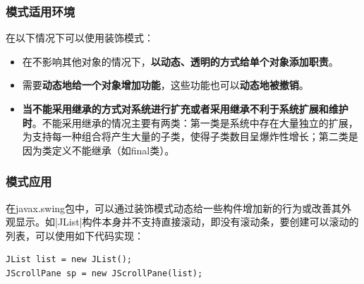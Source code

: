 \subsubsection{模式适用环境}
在以下情况下可以使用装饰模式：
\begin{itemize}
    \item 在不影响其他对象的情况下，\textbf{以动态、透明的方式给单个对象添加职责}。
    \item 需要\textbf{动态地给一个对象增加功能}，这些功能也可以\textbf{动态地被撤销}。
    \item \textbf{当不能采用继承的方式对系统进行扩充或者采用继承不利于系统扩展和维护时}。不能采用继承的情况主要有两类：第一类是系统中存在大量独立的扩展，为支持每一种组合将产生大量的子类，使得子类数目呈爆炸性增长；第二类是因为类定义不能继承（如final类）。
\end{itemize}

\subsubsection{模式应用}
 在javax.swing包中，可以通过装饰模式动态给一些构件增加新的行为或改善其外观显示。如\sverb|JList|\;构件本身并不支持直接滚动，即没有滚动条，要创建可以滚动的列表，可以使用如下代码实现：
\begin{lstlisting}
JList list = new JList();
JScrollPane sp = new JScrollPane(list);  
\end{lstlisting}

